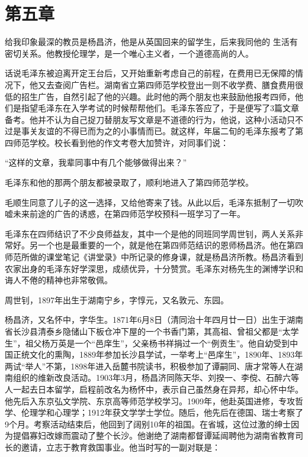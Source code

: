 \documentclass[../../dazhuan.tex]{subfiles}
\begin{document}
\chapter*{第五章}
\begin{pref}
	给我印象最深的教员是杨昌济，他是从英国回来的留学生，后来我同他的	
生活有密切关系。他教授伦理学，是一个唯心主义者，一个道德高尚的人。
\end{pref}

话说毛泽东被迫离开定王台后，又开始重新考虑自己的前程，在费用已无保障的情况下，他又去查阅广告栏。湖南省立第四师范学校登出一则不收学费、膳食费用很低的招生广告，自然引起了他的兴趣。此时他的两个朋友也来鼓励他报考四师，他们是指望毛泽东在入学考试的时候帮帮他们。毛泽东答应了，于是便写了3篇文章备考。他并不认为自己捉刀替朋友写文章是不道德的行为，他说，这种小活动只不过是事关友谊的不得已而为之的小事情而已。就这样，年届二旬的毛泽东报考了第四师范学校。校长看到他的作文考卷大加赞许，对同事们说：

“这样的文章，我辈同事中有几个能够做得出来？”

毛泽东和他的那两个朋友都被录取了，顺利地进入了第四师范学校。

毛顺生同意了儿子的这一选择，又给他寄来了钱。从此以后，毛泽东抵制了一切吹嘘未来前途的广告的诱惑，在第四师范学校预科一班学习了一年。

毛泽东在四师结识了不少良师益友，其中一个是他的同班同学周世钊，两人关系非常好。另一个也是最重要的一个，就是他在第四师范结识的恩师杨昌济。他在第四师范所做的课堂笔记《讲堂录》中所记录的修身课，就是杨昌济所教。杨昌济看到农家出身的毛泽东好学深思，成绩优异，十分赞赏。毛泽东对杨先生的渊博学识和诲人不倦的精神也非常敬佩。

周世钊，1897年出生于湖南宁乡，字惇元，又名敦元、东园。

杨昌济，又名怀中，字华生。1871年6月8日（清同治十年四月廿一日）出生于湖南省长沙县清泰乡隐储山下板仓冲下屋的一个书香门第，其高祖、曾祖父都是“太学生”，祖父杨万英是一个“邑庠生”，父亲杨书祥捐过一个“例贡生”。他自幼受到中国正统文化的熏陶，1889年参加长沙县学试，一举考上“邑庠生”，1890年、1893年两试“举人”不第，1898年进入岳麓书院读书，积极参加了谭嗣同、唐才常等人在湖南组织的维新改良活动。1903年3月，杨昌济同陈天华、刘揆一、李傥、石醉六等人一起去日本留学，启程前改名为杨怀中，表示自己虽然身在异邦，却心怀中华。他先后入东京弘文学院、东京高等师范学校学习。1909年，他赴英国进修，专攻哲学、伦理学和心理学；1912年获文学学士学位。随后，他先后在德国、瑞士考察了9个月。考察活动结束后，他回到了阔别10年的祖国。在省城，这位过激的绅士因为提倡寡妇改嫁而震动了整个长沙。他谢绝了湖南都督谭延闿聘他为湖南省教育司长的邀请，立志于教育救国事业。他当时写的一副对联是：
\end{document}
